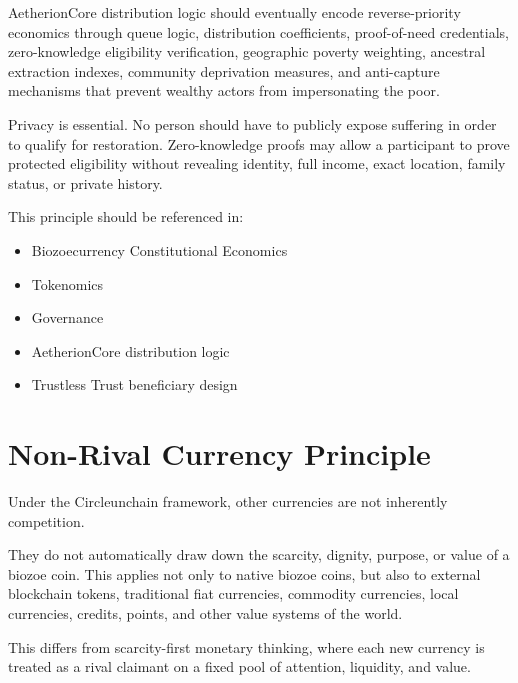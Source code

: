 ﻿\documentclass[12pt]{article}
\begin{document}
AetherionCore distribution logic should eventually encode reverse-priority economics through queue logic, distribution coefficients, proof-of-need credentials, zero-knowledge eligibility verification, geographic poverty weighting, ancestral extraction indexes, community deprivation measures, and anti-capture mechanisms that prevent wealthy actors from impersonating the poor.

Privacy is essential. No person should have to publicly expose suffering in order to qualify for restoration. Zero-knowledge proofs may allow a participant to prove protected eligibility without revealing identity, full income, exact location, family status, or private history.

This principle should be referenced in:

\begin{itemize}
  \item Biozoecurrency Constitutional Economics
\end{itemize}
\begin{itemize}
  \item Tokenomics
\end{itemize}
\begin{itemize}
  \item Governance
\end{itemize}
\begin{itemize}
  \item AetherionCore distribution logic
\end{itemize}
\begin{itemize}
  \item Trustless Trust beneficiary design
\end{itemize}

\section{Non-Rival Currency Principle}


Under the Circleunchain framework, other currencies are not inherently competition.

They do not automatically draw down the scarcity, dignity, purpose, or value of a biozoe coin. This applies not only to native biozoe coins, but also to external blockchain tokens, traditional fiat currencies, commodity currencies, local currencies, credits, points, and other value systems of the world.

This differs from scarcity-first monetary thinking, where each new currency is treated as a rival claimant on a fixed pool of attention, liquidity, and value.
\end{document}
